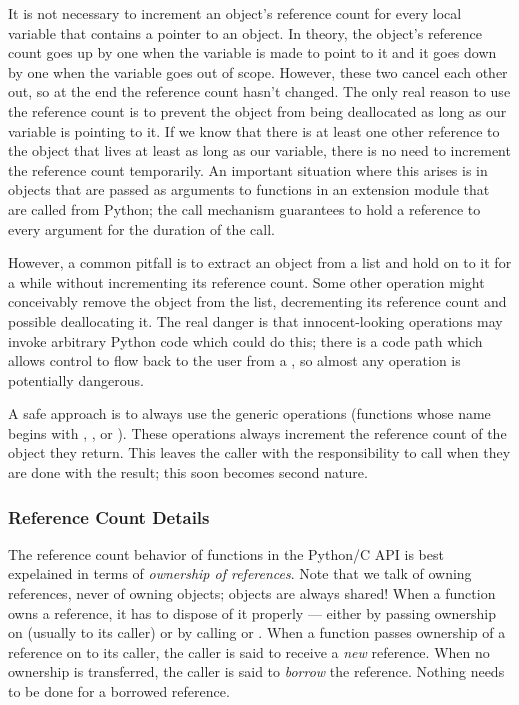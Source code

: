 \documentclass{manual}
\begin{document}
It is not necessary to increment an object's reference count for every 
local variable that contains a pointer to an object.  In theory, the 
object's reference count goes up by one when the variable is made to 
point to it and it goes down by one when the variable goes out of 
scope.  However, these two cancel each other out, so at the end the 
reference count hasn't changed.  The only real reason to use the 
reference count is to prevent the object from being deallocated as 
long as our variable is pointing to it.  If we know that there is at 
least one other reference to the object that lives at least as long as 
our variable, there is no need to increment the reference count 
temporarily.  An important situation where this arises is in objects 
that are passed as arguments to \C{} functions in an extension module 
that are called from Python; the call mechanism guarantees to hold a 
reference to every argument for the duration of the call.

However, a common pitfall is to extract an object from a list and
hold on to it for a while without incrementing its reference count.
Some other operation might conceivably remove the object from the
list, decrementing its reference count and possible deallocating it.
The real danger is that innocent-looking operations may invoke
arbitrary Python code which could do this; there is a code path which
allows control to flow back to the user from a ,
so almost any operation is potentially dangerous.

A safe approach is to always use the generic operations (functions 
whose name begins with , , 
 or ).  These operations always 
increment the reference count of the object they return.  This leaves 
the caller with the responsibility to call 
when they are done with the result; this soon becomes second nature.


\subsubsection{Reference Count Details \label{refcountDetails}}

The reference count behavior of functions in the Python/C API is best 
expelained in terms of \emph{ownership of references}.  Note that we 
talk of owning references, never of owning objects; objects are always 
shared!  When a function owns a reference, it has to dispose of it 
properly --- either by passing ownership on (usually to its caller) or 
by calling  or .  When
a function passes ownership of a reference on to its caller, the
caller is said to receive a \emph{new} reference.  When no ownership
is transferred, the caller is said to \emph{borrow} the reference.
Nothing needs to be done for a borrowed reference.
\end{document}
